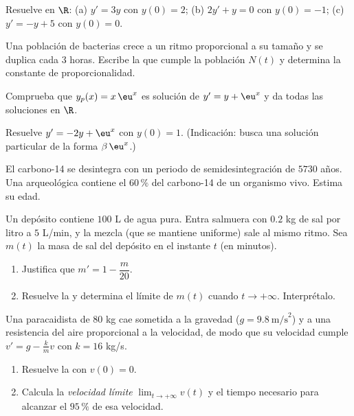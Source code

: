 \begin{exercise}[$\star$]\label{exo:g12:diffeq:1}
Resuelve en $\R$:
(a) $y' = 3y$ con $y(0) = 2$;\quad
(b) $2y' + y = 0$ con $y(0) = -1$;\quad
(c) $y' = -y + 5$ con $y(0) = 0$.
\end{exercise}

\begin{exercise}[$\star$]\label{exo:g12:diffeq:2}
Una población de bacterias crece a un ritmo proporcional a su tamaño y se
duplica cada $3$ horas. Escribe la  que cumple la
población $N(t)$ y determina la constante de proporcionalidad.
\end{exercise}

\begin{exercise}[$\star$]\label{exo:g12:diffeq:3}
Comprueba que $y_p(x) = x\,\eu^{x}$ es solución de $y' = y + \eu^x$ y da
todas las soluciones en $\R$.
\end{exercise}

\begin{exercise}[$\star\star$]\label{exo:g12:diffeq:4}
Resuelve $y' = -2y + \eu^{x}$ con $y(0) = 1$. (Indicación: busca una
solución particular de la forma $\beta\,\eu^{x}$.)
\end{exercise}

\begin{exercise}[$\star\star$]\label{exo:g12:diffeq:5}
El carbono-14 se desintegra con un periodo de semidesintegración de $5730$
años. Una  arqueológica contiene el $60\,\%$ del carbono-14 de un
organismo vivo. Estima su edad.
\end{exercise}

\begin{exercise}[$\star\star$]\label{exo:g12:diffeq:6}
Un depósito contiene $100$ L de agua pura. Entra salmuera con $0.2$ kg de
sal por litro a $5$ L/min, y la mezcla (que se mantiene uniforme) sale al
mismo ritmo. Sea $m(t)$ la masa de sal del depósito en el instante $t$ (en
minutos).
\begin{enumerate}
  \item Justifica que $m' = 1 - \dfrac{m}{20}$.
  \item Resuelve la  y determina el límite de $m(t)$ cuando
        $t \to +\infty$. Interprétalo.
\end{enumerate}
\end{exercise}

\begin{exercise}[$\star\star$]\label{exo:g12:diffeq:7}
Una paracaidista de $80$ kg cae sometida a la gravedad
($g = 9.8\ \text{m/s}^2$) y a una resistencia del aire proporcional a la
velocidad, de modo que su velocidad cumple $v' = g - \frac{k}{m}v$ con
$k = 16$ kg/s.
\begin{enumerate}
  \item Resuelve la  con $v(0) = 0$.
  \item Calcula la \emph{velocidad límite} $\lim_{t\to+\infty} v(t)$ y el
        tiempo necesario para alcanzar el $95\,\%$ de esa velocidad.
\end{enumerate}
\end{exercise}


